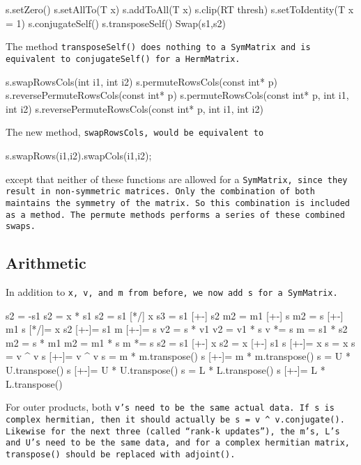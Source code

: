 \begin{tmvcode}
s.setZero()
s.setAllTo(T x)
s.addToAll(T x)
s.clip(RT thresh)
s.setToIdentity(T x = 1)
s.conjugateSelf()
s.transposeSelf()
Swap(s1,s2)
\end{tmvcode}
The method \tt{transposeSelf()} does nothing to a \tt{SymMatrix} and is equivalent to
\tt{conjugateSelf()} for a \tt{HermMatrix}.
\begin{tmvcode}
s.swapRowsCols(int i1, int i2)
s.permuteRowsCols(const int* p)
s.reversePermuteRowsCols(const int* p)
s.permuteRowsCols(const int* p, int i1, int i2)
s.reversePermuteRowsCols(const int* p, int i1, int i2)
\end{tmvcode}
The new method, \tt{swapRowsCols}, would be equivalent to 
\begin{tmvcode}
s.swapRows(i1,i2).swapCols(i1,i2);
\end{tmvcode}
except that neither of these functions are allowed for a \tt{SymMatrix}, since 
they result in non-symmetric matrices.  Only the combination of both
maintains the symmetry of the matrix.  So this combination is included as
a method.  The permute methods performs a series of these
combined swaps.
\vspace{12pt}

\subsection{Arithmetic}
\label{SymMatrix_Arithmetic}

In addition to \tt{x}, \tt{v}, and \tt{m} from before,
we now add \tt{s} for a \tt{SymMatrix}.

\begin{tmvcode}
s2 = -s1
s2 = x * s1
s2 = s1 [*/] x
s3 = s1 [+-] s2
m2 = m1 [+-] s
m2 = s [+-] m1
s [*/]= x
s2 [+-]= s1
m [+-]= s
v2 = s * v1
v2 = v1 * s
v *= s
m = s1 * s2
m2 = s * m1
m2 = m1 * s
m *= s
s2 = s1 [+-] x
s2 = x [+-] s1
s [+-]= x
s = x
s = v ^ v
s [+-]= v ^ v
s = m * m.transpose()
s [+-]= m * m.transpose()
s = U * U.transpose()
s [+-]= U * U.transpose()
s = L * L.transpose()
s [+-]= L * L.transpose()
\end{tmvcode}
For outer products, both \tt{v}'s need to be the same actual data.  If \tt{s}
is complex hermitian, then it should actually be 
\tt{s = v ^ v.conjugate()}.
Likewise for the next three (called ``rank-k updates''), the \tt{m}'s, \tt{L}'s and
\tt{U}'s need to be the
same data, and for a complex hermitian matrix, \tt{transpose()}
should be replaced with \tt{adjoint()}.

